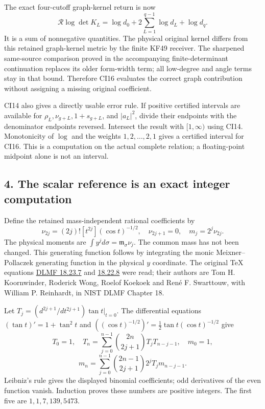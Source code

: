 \documentclass[11pt]{article}
\begin{document}
The exact four-cutoff graph-kernel return is now \[
\boxed{\mathcal R\log\det K_L
=\log d_0+2\sum_{L=1}^{q-1}\log d_L+\log d_q.}
\tag{CI16}
\] It is a sum of nonnegative quantities. The physical original kernel differs from this retained graph-kernel metric by the finite KF49 receiver. The sharpened same-source comparison proved in the accompanying finite-determinant continuation replaces its older form-width term; all low-degree and angle terms stay in that bound. Therefore CI16 evaluates the correct graph contribution without assigning a missing original coefficient.

CI14 also gives a directly usable error rule. If positive certified intervals are available for \(\rho_L,\nu_{g+L},1+s_{g+L}\), and \(|a_L|^2\), divide their endpoints with the denominator endpoints reversed. Intersect the result with \([1,\infty)\) using CI14. Monotonicity of \(\log\) and the weights \(1,2,\ldots,2,1\) gives a certified interval for CI16. This is a computation on the actual complete relation; a floating-point midpoint alone is not an interval.

\subsection{4. The scalar reference is an exact integer computation}\label{the-scalar-reference-is-an-exact-integer-computation}

Define the retained mass-independent rational coefficients by \[
\nu_{2j}=(2j)![t^{2j}](\cos t)^{-1/2},\quad \nu_{2j+1}=0,
\quad m_j=2^j\nu_{2j}.
\tag{CI17}
\] The physical moments are \(\int y^j d\sigma=\mathfrak m_\sigma\nu_j\). The common mass has not been changed. This generating function follows by integrating the monic Meixner--Pollaczek generating function in the physical \(y\) coordinate. The original TeX equations \href{https://dlmf.nist.gov/18.23.E7}{DLMF 18.23.7} and \href{https://dlmf.nist.gov/18.22.E8}{18.22.8} were read; their authors are Tom H. Koornwinder, Roderick Wong, Roelof Koekoek and René F. Swarttouw, with William P. Reinhardt, in NIST DLMF Chapter 18.

Let \(T_j=(d^{2j+1}/dt^{2j+1})\tan t|_{t=0}\). The differential equations \((\tan t)'=1+\tan^2t\) and \(((\cos t)^{-1/2})'=\tfrac12\tan t(\cos t)^{-1/2}\) give \[
T_0=1,\quad T_n=\sum_{j=0}^{n-1}\binom{2n}{2j+1}T_jT_{n-j-1},
\quad m_0=1,
\tag{CI18}
\] \[
\boxed{m_n=\sum_{j=0}^{n-1}\binom{2n-1}{2j+1}2^jT_jm_{n-j-1}.}
\tag{CI19}
\] Leibniz's rule gives the displayed binomial coefficients; odd derivatives of the even function vanish. Induction proves these numbers are positive integers. The first five are \(1,1,7,139,5473\).
\end{document}

